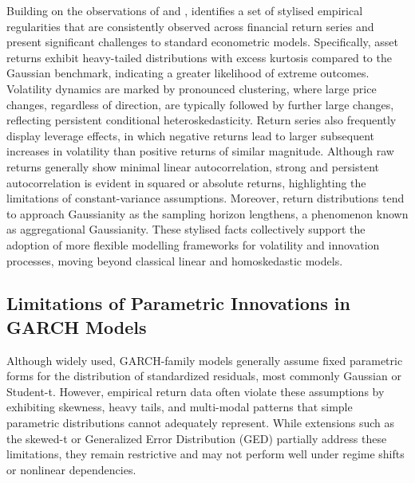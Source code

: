 \documentclass[oneside,12pt]{CUEDthesisPSnPDF}
\newcommand{\textcite}{\citet}
\newcommand{\parencite}{\citep}
\begin{document}
Building on the observations of \textcite{julio2015stylized} and \textcite{aloud2013stylized}, \textcite{cont2001empirical} identifies a set of stylised empirical regularities that are consistently observed across financial return series and present significant challenges to standard econometric models. Specifically, asset returns exhibit heavy-tailed distributions with excess kurtosis compared to the Gaussian benchmark, indicating a greater likelihood of extreme outcomes. Volatility dynamics are marked by pronounced clustering, where large price changes, regardless of direction, are typically followed by further large changes, reflecting persistent conditional heteroskedasticity. Return series also frequently display leverage effects, in which negative returns lead to larger subsequent increases in volatility than positive returns of similar magnitude. Although raw returns generally show minimal linear autocorrelation, strong and persistent autocorrelation is evident in squared or absolute returns, highlighting the limitations of constant-variance assumptions. Moreover, return distributions tend to approach Gaussianity as the sampling horizon lengthens, a phenomenon known as aggregational Gaussianity. These stylised facts collectively support the adoption of more flexible modelling frameworks for volatility and innovation processes, moving beyond classical linear and homoskedastic models.\\



\subsection{Limitations of Parametric Innovations in GARCH Models}
\noindent 
Although widely used, GARCH-family models generally assume fixed parametric forms for the distribution of standardized residuals, most commonly Gaussian or Student-t. However, empirical return data often violate these assumptions by exhibiting skewness, heavy tails, and multi-modal patterns that simple parametric distributions cannot adequately represent. While extensions such as the skewed-t \parencite{hansen1994autoregressive,fernandez1998multivariate} or Generalized Error Distribution (GED) \parencite{nelson1991conditional} partially address these limitations, they remain restrictive and may not perform well under regime shifts or nonlinear dependencies.\\
\end{document}
